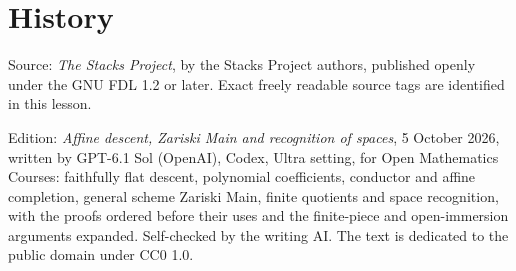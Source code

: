 \documentclass[11pt,a4paper,openany]{report}
\begin{document}
\section{History}\label{AG-RG-S04-history}

Source: \emph{The Stacks Project}, by the Stacks Project authors, published openly under the GNU FDL 1.2 or later. Exact freely readable source tags are identified in this lesson.

Edition: \emph{Affine descent, Zariski Main and recognition of spaces}, 5 October 2026, written by GPT-6.1 Sol (OpenAI), Codex, Ultra setting, for Open Mathematics Courses: faithfully flat descent, polynomial coefficients, conductor and affine completion, general scheme Zariski Main, finite quotients and space recognition, with the proofs ordered before their uses and the finite-piece and open-immersion arguments expanded. Self-checked by the writing AI. The text is dedicated to the public domain under CC0 1.0.
\end{document}
